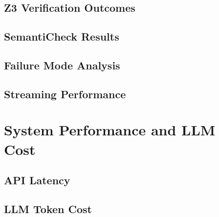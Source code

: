 \documentclass[12pt,a4paper]{report}
\begin{document}
  \subsection{Z3 Verification Outcomes}
  \label{subsec:z3-outcomes}

  \subsection{SemantiCheck Results}
  \label{subsec:semanticheck-results}

  \subsection{Failure Mode Analysis}
  \label{subsec:failure-mode-analysis}

  \subsection{Streaming Performance}
  \label{subsec:streaming-perf}

\section{System Performance and LLM Cost}
\label{sec:system-perf}

  \subsection{API Latency}
  \label{subsec:api-latency}

  \subsection{LLM Token Cost}
  \label{subsec:llm-cost}
\end{document}
